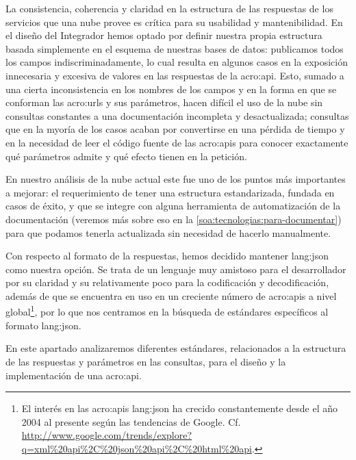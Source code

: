 La consistencia, coherencia y claridad en la estructura de las respuestas de los servicios que una nube provee es crítica para su usabilidad y mantenibilidad. En el diseño del Integrador hemos optado por definir nuestra propia estructura basada simplemente en el esquema de nuestras bases de datos: publicamos todos los campos indiscriminadamente, lo cual resulta en algunos casos en la exposición innecesaria y excesiva de valores en las respuestas de la \gls{acro:api}. Esto, sumado a una cierta inconsistencia en los nombres de los campos y en la forma en que se conforman las \glspl{acro:url} y sus parámetros, hacen difícil el uso de la nube sin consultas constantes a una documentación incompleta y desactualizada; consultas que en la myoría de los casos acaban por convertirse en una pérdida de tiempo y en la necesidad de leer el código fuente de las \glspl{acro:api} para conocer exactamente qué parámetros admite y qué efecto tienen en la petición.

En nuestro análisis de la nube actual este fue uno de los puntos más importantes a mejorar: el requerimiento de tener una estructura estandarizada, fundada en casos de éxito, y que se integre con alguna herramienta de automatización de la documentación (veremos más sobre eso en la \autoref{soa:tecnologias:para-documentar}) para que podamos tenerla actualizada sin necesidad de hacerlo manualmente.

Con respecto al formato de la respuestas, hemos decidido mantener \gls{lang:json} como nuestra opción. Se trata de un lenguaje muy amistoso para el desarrollador por su claridad y su relativamente poco  para la codificación y decodificación, además de que se encuentra en uso en un creciente número de \glspl{acro:api} a nivel global\footnote{El interés en las \glspl{acro:api} \gls{lang:json} ha crecido constantemente desde el año 2004 al presente según las tendencias de Google. Cf. \url{http://www.google.com/trends/explore?q=xml\%20api\%2C\%20json\%20api\%2C\%20html\%20api}.}, por lo que nos centramos en la búsqueda de estándares específicos al formato \gls{lang:json}.

En este apartado analizaremos diferentes estándares, relacionados a la estructura de las respuestas y parámetros en las consultas, para el diseño y la implementación de una \gls{acro:api}.
